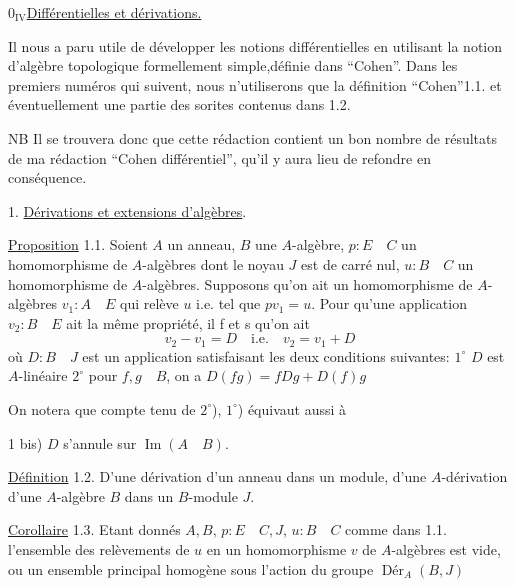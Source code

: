 $0_{\mathrm{IV}}$\quad\uline{Différentielles et dérivations.}

 Il nous a paru utile de développer les notions différentielles en utilisant la notion d'algèbre topologique formellement simple,définie dans ``Cohen''. Dans les premiers numéros qui suivent, nous n'utiliserons que la définition ``Cohen''1.1. et éventuellement une partie des sorites contenus dans 1.2.

NB Il se trouvera donc que cette rédaction contient un bon nombre de résultats de ma rédaction ``Cohen différentiel'', qu'il y aura lieu de refondre en conséquence.

1. \uline{Dérivations et extensions d'algèbres}.

\uline{Proposition} 1.1. Soient $A$ un anneau, $B$ une $A$-algèbre, $p:E\quad C$ un homomorphisme de $A$-algèbres dont le noyau $J$ est de carré nul, $u:B\quad C$ un homomorphisme de $A$-algèbres. Supposons qu'on ait un homomorphisme de $A$-algèbres $v_1:A\quad E$ qui relève $u$ i.e. tel que $pv_1=u$. Pour qu'une application $v_2:B\quad E$ ait la même propriété, il f et s qu'on ait
\[v_2-v_1=D\quad\text{i.e.}\quad v_2=v_1+D\]
\margin{$\unsure{\supset}$}
où $D:B\quad J$ est un application satisfaisant les deux conditions suivantes: $1^\circ$ $D$ est $A$-linéaire $2^\circ$ pour $f,g\quad B$, on a $D(fg)=fDg+D(f)g$
\margin{$\unsure{\supset}$}

On notera que compte tenu de $2^\circ$), $1^\circ$) équivaut aussi à 

1 bis) $D$ s'annule sur $\operatorname{Im}(A\quad B)$.

\uline{Définition} 1.2. D'une dérivation d'un anneau dans un module, d'une $A$-dérivation d'une $A$-algèbre $B$ dans un $B$-module $J$.

\uline{Corollaire} 1.3. Etant donnés $A,B$,  $p:E\quad C,J$, $u:B\quad C$ comme dans 1.1.  l'ensemble des relèvements de $u$ en un homomorphisme $v$ de $A$-algèbres est vide, ou un ensemble principal homogène sous l'action du groupe $\operatorname{Dér}_A(B,J)$

